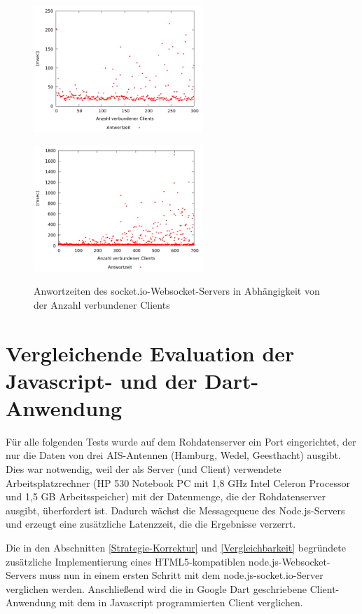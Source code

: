 \begin{figure}[H]
\begin{minipage}[hbt]{3in}
	\centering
	\includegraphics[width=2.5in]{images/stresstest300.png}
	\label{Stresstest300}
\end{minipage}
\hfill
\begin{minipage}[hbt]{3in}
	\centering
	\includegraphics[width=2.5in]{images/stresstest.png}
	\label{Stresstest}
\end{minipage}
\caption{Anwortzeiten des socket.io-Websocket-Servers in Abhängigkeit von der Anzahl verbundener Clients}
\end{figure}
\section{Vergleichende Evaluation der Javascript- und der Dart-Anwendung}
Für alle folgenden Tests wurde auf dem Rohdatenserver ein Port eingerichtet, der nur die Daten von drei AIS-Antennen (Hamburg, Wedel, Geesthacht) ausgibt. Dies war notwendig, weil der als Server (und Client) verwendete Arbeitsplatzrechner (HP 530 Notebook PC mit 1,8 GHz Intel Celeron Processor und 1,5 GB Arbeitsspeicher) mit der Datenmenge, die der Rohdatenserver ausgibt, überfordert ist. Dadurch wächst die Messagequeue des Node.js-Servers und erzeugt eine zusätzliche Latenzzeit, die die Ergebnisse verzerrt.

Die in den Abschnitten  \ref{Strategie-Korrektur} und \ref{Vergleichbarkeit} begründete zusätzliche Implementierung eines HTML5-kompatiblen node.js-Websocket-Servers muss nun in einem ersten Schritt mit dem node.js-socket.io-Server verglichen werden. Anschließend wird die in Google Dart geschriebene Client-Anwendung mit dem in Javascript programmierten Client verglichen.
